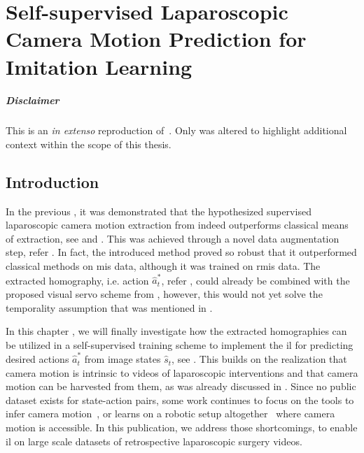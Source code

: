 \graphicspath{{chapter_4}}
\chapter[Self-supervised Laparoscopic Camera Motion Prediction]{Self-supervised Laparoscopic Camera Motion Prediction for Imitation Learning}
\label{chap:camera_motion_prediction}
\minitoc

\paragraph{Disclaimer} This  is an \textit{in extenso} reproduction of~\cite{huber2023deep}. Only  was altered to highlight additional context within the scope of this thesis.

\newpage

\section{Introduction}
\label{c4:sec:introduction}
In the previous , it was demonstrated that the hypothesized supervised laparoscopic camera motion extraction from  indeed outperforms classical means of extraction, see  and . This was achieved through a novel data augmentation step, refer . In fact, the introduced method proved so robust that it outperformed classical methods on \gls{mis} data, although it was trained on \gls{rmis} data. The extracted homography, i.e. action $\hat{a}^*_t$, refer , could already be combined with the proposed visual servo scheme from , however, this would not yet solve the temporality assumption that was mentioned in .

In this chapter , we will finally investigate how the extracted homographies can be utilized in a self-supervised training scheme to implement the \gls{il} for predicting desired actions $\hat{a}^*_t$ from image states $\hat{s}_t$, see . This builds on the realization that camera motion is intrinsic to videos of laparoscopic interventions and that camera motion can be harvested from them, as was already discussed in . Since no public dataset exists for state-action pairs, some work continues to focus on the tools to infer camera motion~\cite{li2021data}, or learns on a robotic setup altogether~\cite{li20223d} where camera motion is accessible. In this publication, we address those shortcomings, to enable \gls{il} on large scale datasets of retrospective laparoscopic surgery videos.

